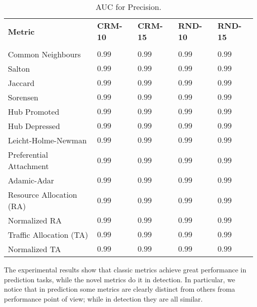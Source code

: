 \begin{table}[h]
	\centering
	\begin{tabular}{l l l l l}
	\toprule
	\textbf{Metric} & \textbf{CRM-10} & \textbf{CRM-15} & \textbf{RND-10} & \textbf{RND-15}\\\\
	\midrule
		Common Neighbours & $0.99$ & $0.99$ & $0.99$ & $0.99$ \\
		Salton  & $0.99$ & $0.99$ & $0.99$ & $0.99$ \\
		Jaccard  & $0.99$ & $0.99$ & $0.99$ & $0.99$ \\
		Sorensen   & $0.99$ & $0.99$ & $0.99$ & $0.99$ \\
		Hub Promoted  & $0.99$ & $0.99$ & $0.99$ & $0.99$ \\
		Hub Depressed  & $0.99$ & $0.99$ & $0.99$ & $0.99$ \\
		Leicht-Holme-Newman  & $0.99$ & $0.99$ & $0.99$ & $0.99$ \\
		Preferential Attachment  & $0.99$ & $0.99$ & $0.99$ & $0.99$ \\
		Adamic-Adar  & $0.99$ & $0.99$ & $0.99$ & $0.99$ \\
		Resource Allocation (RA)  & $0.99$ & $0.99$ & $0.99$ & $0.99$ \\
		Normalized RA  & $0.99$ & $0.99$ & $0.99$ & $0.99$ \\
		Traffic Allocation (TA)  & $0.99$ & $0.99$ & $0.99$ & $0.99$ \\
		Normalized TA  & $0.99$ & $0.99$ & $0.99$ & $0.99$ \\
	\bottomrule
	\end{tabular}
	\label{tab:auc-prediction}
	\caption{AUC for Precision.}
\end{table}	

The experimental results show that classic metrics achieve great performance in prediction tasks, while the novel metrics do it in detection.
In particular, we notice that in prediction some metrics are clearly distinct from others froma performance point of view; while in detection they are all similar.



     


